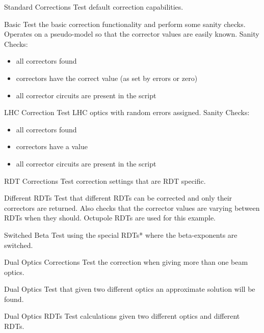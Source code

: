 \begin{testlist}
\item[Standard Corrections] Test default correction capabilities.
    \begin{testlist}
        \item[Basic] Test the basic correction functionality and perform some sanity checks.
        Operates on a pseudo-model so that the corrector values are easily known.
        Sanity Checks:
        \begin{itemize}
            \item all correctors found
            \item correctors have the correct value (as set by errors or zero)
            \item all corrector circuits are present in the  script
        \end{itemize}
        \item[LHC Correction] Test LHC optics with random errors assigned.
        Sanity Checks:
        \begin{itemize}
            \item all correctors found
            \item correctors have a value
            \item all corrector circuits are present in the  script
        \end{itemize}
    \end{testlist}
\item[RDT Corrections] Test correction settings that are RDT specific.
    \begin{testlist}
        \item[Different RDTs] Test that different RDTs can be corrected and only their correctors
        are returned. Also checks that the corrector values are varying between RDTs
        when they should. Octupole RDTs are used for this example.
        \item[Switched Beta] Test using the special RDTs* where the beta-exponents are switched.
    \end{testlist}
\item[Dual Optics Corrections] Test the correction when giving more than one beam optics.
    \begin{testlist}
        \item[Dual Optics] Test that given two different optics an approximate solution will be found.
        \item[Dual Optics RDTs] Test calculations given two different optics and different RDTs.

\end{testlist}
\end{testlist}
